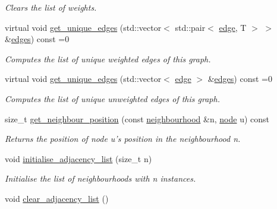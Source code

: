 \begin{DoxyCompactItemize}
\begin{DoxyCompactList}\small\item\em Clears the list of weights. \end{DoxyCompactList}\item 
virtual void \hyperlink{classlgraph_1_1wxgraph_a50a9be174538c50c0f2a7ebeaa34ca4d}{get\-\_\-unique\-\_\-edges} (std\-::vector$<$ std\-::pair$<$ \hyperlink{namespacelgraph_a76bd7d50719f03de7a85db259d80d572}{edge}, T $>$ $>$ \&\hyperlink{classlgraph_1_1wxgraph_aed7f8e1486d9e2352fc1891521913b4f}{edges}) const =0
\begin{DoxyCompactList}\small\item\em Computes the list of unique weighted edges of this graph. \end{DoxyCompactList}\item 
virtual void \hyperlink{classlgraph_1_1wxgraph_a6c1de8061b1606071320a01dd1b5fe64}{get\-\_\-unique\-\_\-edges} (std\-::vector$<$ \hyperlink{namespacelgraph_a76bd7d50719f03de7a85db259d80d572}{edge} $>$ \&\hyperlink{classlgraph_1_1wxgraph_aed7f8e1486d9e2352fc1891521913b4f}{edges}) const =0
\begin{DoxyCompactList}\small\item\em Computes the list of unique unweighted edges of this graph. \end{DoxyCompactList}\item 
size\-\_\-t \hyperlink{classlgraph_1_1xxgraph_a8c176b1d19cf8d0b299c419e325df21d}{get\-\_\-neighbour\-\_\-position} (const \hyperlink{namespacelgraph_a052e7766c13f3a43cec0aec8173fdede}{neighbourhood} \&n, \hyperlink{namespacelgraph_a397169dd66adf725210a30fb7251773e}{node} u) const 
\begin{DoxyCompactList}\small\item\em Returns the position of node {\itshape u's} position in the neighbourhood {\itshape n}. \end{DoxyCompactList}\item 
\hypertarget{classlgraph_1_1xxgraph_a682d586f850add8b7e637aeea81b0292}{void \hyperlink{classlgraph_1_1xxgraph_a682d586f850add8b7e637aeea81b0292}{initialise\-\_\-adjacency\-\_\-list} (size\-\_\-t n)}\label{classlgraph_1_1xxgraph_a682d586f850add8b7e637aeea81b0292}

\begin{DoxyCompactList}\small\item\em Initialise the list of neighbourhoods with {\itshape n} instances. \end{DoxyCompactList}\item 
\hypertarget{classlgraph_1_1xxgraph_a6b15c62c68919722f7eb18fe273d45fe}{void \hyperlink{classlgraph_1_1xxgraph_a6b15c62c68919722f7eb18fe273d45fe}{clear\-\_\-adjacency\-\_\-list} ()}\label{classlgraph_1_1xxgraph_a6b15c62c68919722f7eb18fe273d45fe}


\end{DoxyCompactItemize}
